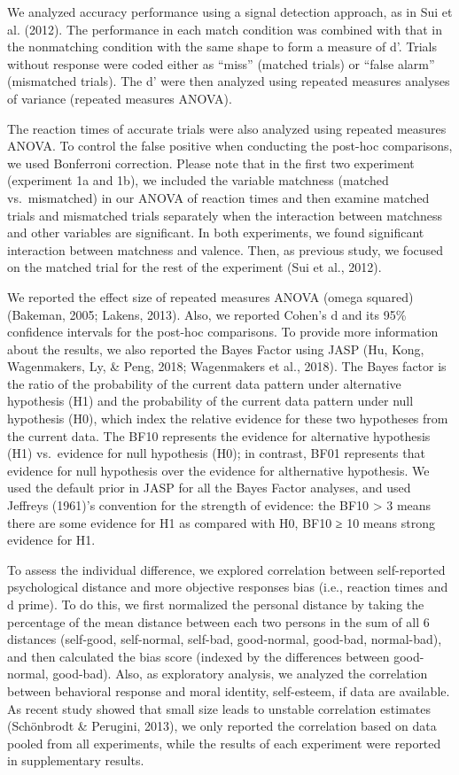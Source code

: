 \documentclass[man]{apa6}
\begin{document}
We analyzed accuracy performance using a signal detection approach, as in Sui et al. (2012). The performance in each match condition was combined with that in the nonmatching condition with the same shape to form a measure of d'. Trials without response were coded either as \enquote{miss} (matched trials) or \enquote{false alarm} (mismatched trials). The d' were then analyzed using repeated measures analyses of variance (repeated measures ANOVA).

The reaction times of accurate trials were also analyzed using repeated measures ANOVA. To control the false positive when conducting the post-hoc comparisons, we used Bonferroni correction. Please note that in the first two experiment (experiment 1a and 1b), we included the variable matchness (matched vs.~mismatched) in our ANOVA of reaction times and then examine matched trials and mismatched trials separately when the interaction between matchness and other variables are significant. In both experiments, we found significant interaction between matchness and valence. Then, as previous study, we focused on the matched trial for the rest of the experiment (Sui et al., 2012).

We reported the effect size of repeated measures ANOVA (omega squared) (Bakeman, 2005; Lakens, 2013). Also, we reported Cohen's d and its 95\% confidence intervals for the post-hoc comparisons. To provide more information about the results, we also reported the Bayes Factor using JASP (Hu, Kong, Wagenmakers, Ly, \& Peng, 2018; Wagenmakers et al., 2018). The Bayes factor is the ratio of the probability of the current data pattern under alternative hypothesis (H1) and the probability of the current data pattern under null hypothesis (H0), which index the relative evidence for these two hypotheses from the current data. The BF10 represents the evidence for alternative hypothesis (H1) vs.~evidence for null hypothesis (H0); in contrast, BF01 represents that evidence for null hypothesis over the evidence for althernative hypothesis. We used the default prior in JASP for all the Bayes Factor analyses, and used Jeffreys (1961)'s convention for the strength of evidence: the BF10 \textgreater{} 3 means there are some evidence for H1 as compared with H0, BF10 ≥ 10 means strong evidence for H1.

To assess the individual difference, we explored correlation between self-reported psychological distance and more objective responses bias (i.e., reaction times and d prime). To do this, we first normalized the personal distance by taking the percentage of the mean distance between each two persons in the sum of all 6 distances (self-good, self-normal, self-bad, good-normal, good-bad, normal-bad), and then calculated the bias score (indexed by the differences between good-normal, good-bad). Also, as exploratory analysis, we analyzed the correlation between behavioral response and moral identity, self-esteem, if data are available. As recent study showed that small size leads to unstable correlation estimates (Schönbrodt \& Perugini, 2013), we only reported the correlation based on data pooled from all experiments, while the results of each experiment were reported in supplementary results.
\end{document}
